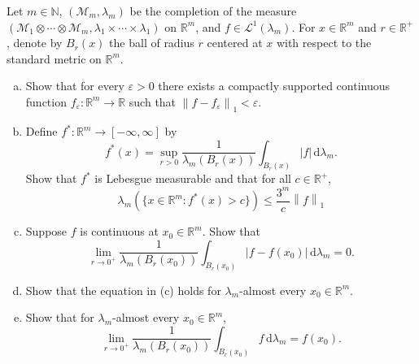 \documentclass[10pt]{article}
\newcommand{\dd}{\,\mathrm{d}}
\providecommand{\eps}{\varepsilon}
\providecommand{\NN}{\mathbb N}
\providecommand{\RR}{\mathbb R}
\providecommand{\ii}{\item}
\providecommand{\abs}[1]{\left\lvert #1\right\rvert}
\providecommand{\norm}[1]{\left\| #1\right\|}
\begin{document}
\begin{problem}
    Let $m\in\NN$, $(\mathcal M_m,\lambda_m)$ be the completion of
    the measure $(\mathcal M_1\otimes\cdots\otimes\mathcal M_m,
    \lambda_1\times\cdots\times\lambda_1)$ on $\RR^m$,
    and $f\in\mathcal L^1(\lambda_m)$.
    For $x\in\RR^m$ and $r\in\RR^+$, denote by $B_r(x)$
    the ball of radius $r$ centered at $x$ with respect to
    the standard metric on $\RR^m$.
    \begin{enumerate}[(a)]
        \ii Show that for every $\eps>0$ there exists
	a compactly supported continuous function $f_\eps\colon\RR^m\to\RR$
	such that $\norm{f-f_\eps}_1 < \eps$.
	\ii Define $f^*\colon\RR^m\to[-\infty,\infty]$ by
	\begin{equation*}
	    f^*(x) = \sup_{r > 0} \frac 1{\lambda_m(B_r(x))}\int_{B_r(x)}\abs f
	    \dd\lambda_m.
	\end{equation*}
	Show that $f^*$ is Lebesgue measurable and that for all $c\in\RR^+$,
	\begin{equation*}
	    \lambda_m(\{x\in\RR^m\colon f^*(x) > c\}) \le \frac{3^m}c\norm f_1
	\end{equation*}
	\ii Suppose $f$ is continuous at $x_0\in\RR^m$. Show that
	\begin{equation*}
	    \lim_{r\to0^+}\frac 1{\lambda_m(B_r(x_0))}
	    \int_{B_r(x_0)}\abs{f-f(x_0)}\dd\lambda_m = 0.
	\end{equation*}
	\ii Show that the equation in (c) holds for
	$\lambda_m$-almost every $x_0\in\RR^m$.
	\ii Show that for $\lambda_m$-almost every $x_0\in\RR^m$,
	\begin{equation*}
	    \lim_{r\to 0^+}\frac 1{\lambda_m(B_r(x_0))}\int_{B_r(x_0)}f\dd\lambda_m
	    = f(x_0).
	\end{equation*}
    \end{enumerate}
\end{problem}
\end{document}
